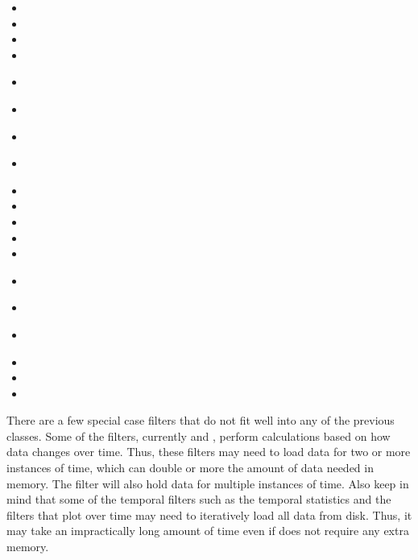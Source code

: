 \begin{multicols}{2}
  \begin{itemize}
  \item {}
  \item {}
  \item {}
  \item {}
  \item {}~\extractGroup
  \item {}~\glyph
  \item {}~\group
  \item {}~
  \item {}
  \item {}
  \item {}
  \item {}
  \item {}
  \item {}~
  \item {}~
  \item {}~
  \item {}
  \item {}
  \item {}
  \end{itemize}
\end{multicols}

There are a few special case filters that do not fit well into any of the
previous classes.  Some of the filters, currently  and , perform calculations based on
how data changes over time.  Thus, these filters may need to load data for
two or more instances of time, which can double or more the amount of data
needed in memory.  The  filter will also hold data for
multiple instances of time.  Also keep in mind that some of the temporal
filters such as the temporal statistics and the filters that plot over time
may need to iteratively load all data from disk.  Thus, it may take an
impractically long amount of time even if does not require any extra
memory.

